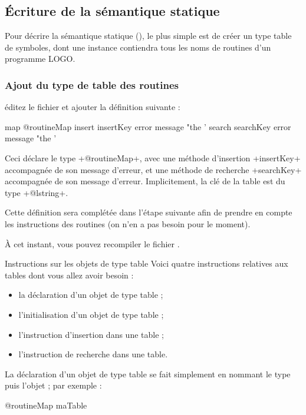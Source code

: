 \subsection{Écriture de la sémantique statique}
Pour décrire la sémantique statique (), le plus simple est de créer un type table de symboles, dont une instance contiendra tous les noms de routines d'un programme LOGO.

\subsubsection{Ajout du type de table des routines}
éditez le fichier  et ajouter la définition suivante :

\begin{galgas}
map @routineMap {
  insert insertKey error message "the '%
  search searchKey error message "the '%
}
\end{galgas}

Ceci déclare le type \ggs+@routineMap+, avec une méthode d'insertion \ggs+insertKey+ accompagnée de son message d'erreur, et une méthode de recherche \ggs+searchKey+ accompagnée de son message d'erreur. Implicitement, la clé de la table est du type \ggs+@lstring+.

Cette définition sera complétée dans l'étape suivante afin de prendre en compte les instructions des routines (on n'en a pas besoin pour le moment).

À cet instant, vous pouvez recompiler le fichier .

Instructions sur les objets de type table
Voici quatre instructions relatives aux tables dont vous allez avoir besoin :
\begin{itemize}
  \item la déclaration d'un objet de type table ;
  \item l'initialisation d'un objet de type table ;
  \item l'instruction d'insertion dans une table ;
  \item l'instruction de recherche dans une table.
\end{itemize}

La déclaration d'un objet de type table se fait simplement en nommant le type puis l'objet ; par exemple :
\begin{galgas}
@routineMap maTable
\end{galgas}

